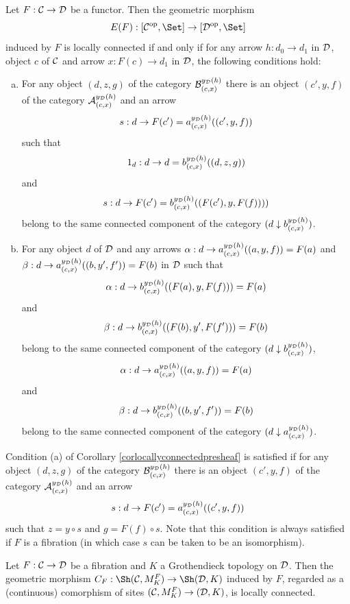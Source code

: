 \documentclass[a4paper,12pt]{article}
\begin{document}
\begin{corollary}\label{corlocallyconnectedpresheaf}
	Let $F:{\cal C}\to {\cal D}$ be a functor. Then the geometric morphism
	\[
	E(F):[{\cal C}^{\textup{op}}, \Set]\to [{\cal D}^{\textup{op}}, \Set]
	\]
	induced by $F$ is locally connected if and only if for any arrow $h:d_{0}\to d_{1}$ in $\cal D$, object $c$ of $\cal C$ and arrow $x:F(c)\to d_{1}$ in $\cal D$, the following conditions hold:
	\begin{enumerate}[(a)]
		\item For any object $(d, z, g)$ of the category ${\cal B}^{y_{\cal D}(h)}_{(c, x)}$ there is an object $(c', y, f)$ of the category ${\cal A}^{y_{\cal D}(h)}_{(c, x)}$ and an arrow $$s:d\to F(c')= a^{y_{\cal D}(h)}_{(c, x)}((c', y, f))$$ such that $$1_{d}:d\to d=b^{y_{\cal D}(h)}_{(c, x)}((d, z, g))$$ and $$s:d\to F(c')=b^{y_{\cal D}(h)}_{(c, x)}((F(c'), y, F(f))))$$ belong to the same connected component of the category $(d\downarrow b^{y_{\cal D}(h)}_{(c, x)})$.  
		
		\item For any object $d$ of $\cal D$ and any arrows $\alpha:d\to a^{y_{\cal D}(h)}_{(c, x)}((a, y, f))=F(a)$ and $\beta:d\to a^{y_{\cal D}(h)}_{(c, x)}((b, y', f'))=F(b)$ in $\cal D$ such that $$\alpha:d\to b^{y_{\cal D}(h)}_{(c, x)}((F(a), y, F(f)))=F(a)$$ and $$\beta:d\to b^{y_{\cal D}(h)}_{(c, x)}((F(b), y', F(f')))=F(b)$$ belong to the same connected component of the category $(d\downarrow b^{y_{\cal D}(h)}_{(c, x)})$, $$\alpha:d\to a^{y_{\cal D}(h)}_{(c, x)}((a, y, f))=F(a)$$ and $$\beta:d\to b^{y_{\cal D}(h)}_{(c, x)}((b, y', f'))=F(b)$$ belong to the same connected component of the category $(d\downarrow a^{y_{\cal D}(h)}_{(c, x)})$.
	\end{enumerate}
\end{corollary}

\begin{remark}\label{remconditionalocallyconnected}
	Condition (a) of Corollary \ref{corlocallyconnectedpresheaf} is satisfied if for any object $(d, z, g)$ of the category ${\cal B}^{y_{\cal D}(h)}_{(c, x)}$ there is an object $(c', y, f)$ of the category ${\cal A}^{y_{\cal D}(h)}_{(c, x)}$ and an arrow $$s:d\to F(c')= a^{y_{\cal D}(h)}_{(c, x)}((c', y, f))$$ such that $z=y\circ s$ and $g=F(f)\circ s$. Note that this condition is always satisfied if $F$ is a fibration (in which case $s$ can be taken to be an isomorphism).
\end{remark}

\begin{corollary}\label{corfibrationslocallyconnected}
	Let $F:{\cal C}\to {\cal D}$ be a fibration and $K$ a Grothendieck topology on $\cal D$. Then the geometric morphism $C_{F}:\Sh({\cal C}, M^{F}_{K})\to \Sh({\cal D}, K)$ induced by $F$, regarded as a (continuous) comorphism of sites $({\cal C}, M^{F}_{K})\to ({\cal D}, K)$, is locally connected.
\end{corollary}
\end{document}
